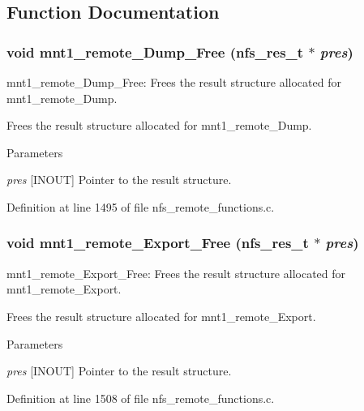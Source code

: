 \subsection{Function Documentation}
\subsubsection[{mnt1\_\-remote\_\-Dump\_\-Free}]{\setlength{\rightskip}{0pt plus 5cm}void mnt1\_\-remote\_\-Dump\_\-Free (nfs\_\-res\_\-t $\ast$ {\em pres})}\label{group__NFSprocs_gadb86516366f1b8e4c2aa0d28e62c6e31}
mnt1\_\-remote\_\-Dump\_\-Free: Frees the result structure allocated for mnt1\_\-remote\_\-Dump.

Frees the result structure allocated for mnt1\_\-remote\_\-Dump.


\begin{DoxyParams}{Parameters}
\item[{\em pres}][INOUT] Pointer to the result structure. \end{DoxyParams}


Definition at line 1495 of file nfs\_\-remote\_\-functions.c.
\subsubsection[{mnt1\_\-remote\_\-Export\_\-Free}]{\setlength{\rightskip}{0pt plus 5cm}void mnt1\_\-remote\_\-Export\_\-Free (nfs\_\-res\_\-t $\ast$ {\em pres})}\label{group__NFSprocs_ga3ccf08b7b908c4079abecbf91f8950cd}
mnt1\_\-remote\_\-Export\_\-Free: Frees the result structure allocated for mnt1\_\-remote\_\-Export.

Frees the result structure allocated for mnt1\_\-remote\_\-Export.


\begin{DoxyParams}{Parameters}
\item[{\em pres}][INOUT] Pointer to the result structure. \end{DoxyParams}


Definition at line 1508 of file nfs\_\-remote\_\-functions.c.
